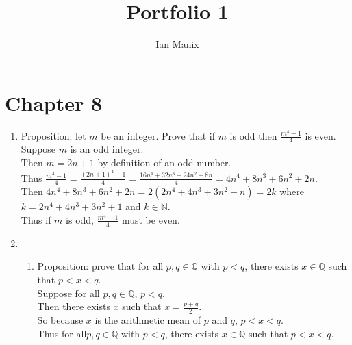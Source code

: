 \documentclass[sigconf]{article}
\title{
  \textbf{Portfolio 1} \\
  }
\author{ 
  Ian Manix
  }
\begin{document}



\maketitle




\section*{Chapter 8}
\begin{enumerate}
  \item Proposition: let $m$ be an integer. Prove that if $m$ is odd then $\frac{m^4-1}{4}$ is even.\\
        Suppose $m$ is an odd integer.\\
        Then $m=2n+1$ by definition of an odd number.\\
        Thus $\frac{m^4-1}{4}=\frac{(2n+1)^4-1}{4}=\frac{16n^4+32n^3+24n^2+8n}{4}=4n^4+8n^3+6n^2+2n$.\\
        Then $4n^4+8n^3+6n^2+2n=2(2n^4+4n^3+3n^2+n)=2k$ where $k=2n^4+4n^3+3n^2+1$ and $k\in\mathbb{N}$.\\
        Thus if $m$ is odd, $\frac{m^4-1}{4}$ must be even.

  \item \begin{enumerate}
      \item Proposition: prove that for all $p,q\in\mathbb{Q}$ with $p<q$, there exists $x\in\mathbb{Q}$ such that $p<x<q$.\\
            Suppose for all $p,q\in\mathbb{Q}$, $p<q$.\\
            Then there exists $x$ such that $x=\frac{p+q}{2}$.\\
            So because $x$ is the arithmetic mean of $p$ and $q$, $p<x<q$.\\
            Thus for all$p,q\in\mathbb{Q}$ with $p<q$, there exists $x\in\mathbb{Q}$ such that $p<x<q$.


\end{enumerate}
\end{enumerate}
\end{document}
